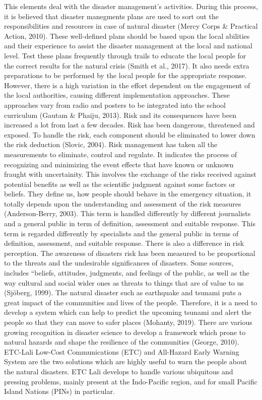 This elements deal with the disaster management’s activities. During this process, it is believed that disaster manegments plans are  used to sort out the responsibilities and resources in case of natural disaster (Mercy Corps & Practical Action, 2010). These well-defined plans should be based upon the local abilities and their experience to assist the disaster management at the local and national level.  Test these plans frequently through trails to educate the local people for the correct results for the natural crisis (Smith et al., 2017).  It also needs extra preparations  to be performed by the local people  for the appropriate response. However, there is a high variation in the effort dependent on the engagement of the local authorities, causing different implementation approaches. These approaches vary from radio and posters to be integrated into the school curriculum (Gautam & Phaiju, 2013).
Risk and its consequences have been increased a lot from last a few decades. Risk has been dangerous, threatened and exposed. To handle the risk, each component should be eliminated to lower down the risk deduction (Slovic, 2004).  Risk management has taken all the measurements  to eliminate, control and regulate. It indicates the process of recognizing and minimizing the event effects that have known or unknown fraught with uncertainity. This involves the exchange of the risks received against potential benefits as well as the  scientific judgment against some factors or beliefs. They define us, how people should behave in the emergency situation, it totally depends upon the understanding and assessment of the risk measures (Anderson-Berry, 2003).
This term is handled differently by different journalists and a general public in term of definition, assessment and suitable response. 
This term is regarded differently by specialists and the general public in terms of definition, assessment, and suitable response. There is also a difference in risk perception. The awareness of disasters risk has been measured to be proportional to the threats and the undesirable significances of disasters. Some sources, includes “beliefs, attitudes, judgments, and feelings of the public, as well as the way cultural and social wider ones as threats to things that are of value to us (Sjöberg, 1999).
The natural disaster such as earthquake and tsunami puts a great impact of the communities and lives of the people. Therefore, it is a need to develop a system which can help to predict the upcoming tsunami and alert the people so that they can move to safer places (Mohanty, 2019).  There are various  growing recognition in disaster science to develop a framework which prone to natural hazards and  shape the resilience of the communities (George, 2010). ETC-Lali Low-Cost Communications (ETC) and All-Hazard Early Warning System are the two solutions which are highly useful to warn the people about the natural disasters. ETC Lali develops to  handle various  ubiquitous and pressing problems,  mainly present at the Indo-Pacific region, and for small Pacific Island Nations (PINs) in particular.
